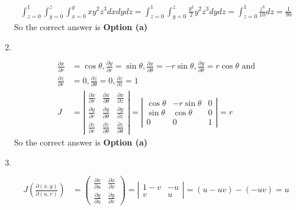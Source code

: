 \begin{enumerate}
\begin{answer}
\begin{align*}
		\int_{z=0}^{1} \int_{y=0}^{z} \int_{x=0}^{y} x y^{2} z^{3} d x d y d z=\int_{z=0}^{1} \int_{y=0}^{z} \frac{y^{2}}{2} y^{2} z^{3} d y d z=\int_{z=0}^{1} \frac{z^{8}}{10} d z=\frac{1}{90}
		\end{align*}
		So the correct answer is \textbf{Option (a)}
	\end{answer}
		\item  $\left. \right. $
	\begin{answer}
		\begin{align*}
		\frac{\partial x}{\partial r}&=\cos \theta, \frac{\partial y}{\partial r}=\sin \theta, \frac{\partial x}{\partial \theta}=-r \sin \theta, \frac{\partial y}{\partial \theta}=r \cos \theta\text{ and}\\
		\frac{\partial z}{\partial r}&=0, \frac{\partial z}{\partial \theta}=0, \frac{\partial z}{\partial z}=1\\
		J&=\left|\begin{array}{lll}\frac{\partial x}{\partial r} & \frac{\partial x}{\partial \theta} & \frac{\partial x}{\partial z} \\ \frac{\partial y}{\partial r} & \frac{\partial y}{\partial \theta} & \frac{\partial y}{\partial z} \\ \frac{\partial z}{\partial r} & \frac{\partial z}{\partial \theta} & \frac{\partial z}{\partial \theta}\end{array}\right|=\left|\begin{array}{ccc}\cos \theta & -r \sin \theta & 0 \\ \sin \theta & \cos \theta & 0 \\ 0 & 0 & 1\end{array}\right|=r
		\end{align*}
		So the correct answer is \textbf{Option (a)}
	\end{answer}
		\item  $\left. \right. $
	\begin{answer}
		\begin{align*}
		J\left(\frac{\partial(x, y)}{\partial(u, v)}\right)&=\left(\begin{array}{ll}\frac{\partial x}{\partial u} & \frac{\partial x}{\partial v} \\ \frac{\partial y}{\partial u} & \frac{\partial y}{\partial v}\end{array}\right)=\left|\begin{array}{cc}1-v & -u \\ v & u\end{array}\right|=(u-u v)-(-u v)=u
		\end{align*}

\end{answer}
\end{enumerate}

